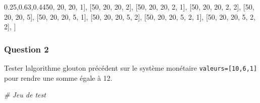 \documentclass[
  paper=a4,
  ,captions=tableheading
]{scrartcl}
\newenvironment{Shaded}{}{}
\newcommand{\CommentTok}[1]{\textcolor[rgb]{0.38,0.63,0.69}{\textit{#1}}}
\newcommand{\DecValTok}[1]{\textcolor[rgb]{0.25,0.63,0.44}{#1}}
\newcommand{\NormalTok}[1]{#1}
\begin{document}
\begin{Shaded}
\begin{Highlighting}[]
\NormalTok{    [}\DecValTok{50}\NormalTok{, }\DecValTok{20}\NormalTok{, }\DecValTok{20}\NormalTok{, }\DecValTok{1}\NormalTok{],}
\NormalTok{    [}\DecValTok{50}\NormalTok{, }\DecValTok{20}\NormalTok{, }\DecValTok{20}\NormalTok{, }\DecValTok{2}\NormalTok{],}
\NormalTok{    [}\DecValTok{50}\NormalTok{, }\DecValTok{20}\NormalTok{, }\DecValTok{20}\NormalTok{, }\DecValTok{2}\NormalTok{, }\DecValTok{1}\NormalTok{],}
\NormalTok{    [}\DecValTok{50}\NormalTok{, }\DecValTok{20}\NormalTok{, }\DecValTok{20}\NormalTok{, }\DecValTok{2}\NormalTok{, }\DecValTok{2}\NormalTok{],}
\NormalTok{    [}\DecValTok{50}\NormalTok{, }\DecValTok{20}\NormalTok{, }\DecValTok{20}\NormalTok{, }\DecValTok{5}\NormalTok{],}
\NormalTok{    [}\DecValTok{50}\NormalTok{, }\DecValTok{20}\NormalTok{, }\DecValTok{20}\NormalTok{, }\DecValTok{5}\NormalTok{, }\DecValTok{1}\NormalTok{],}
\NormalTok{    [}\DecValTok{50}\NormalTok{, }\DecValTok{20}\NormalTok{, }\DecValTok{20}\NormalTok{, }\DecValTok{5}\NormalTok{, }\DecValTok{2}\NormalTok{],}
\NormalTok{    [}\DecValTok{50}\NormalTok{, }\DecValTok{20}\NormalTok{, }\DecValTok{20}\NormalTok{, }\DecValTok{5}\NormalTok{, }\DecValTok{2}\NormalTok{, }\DecValTok{1}\NormalTok{],}
\NormalTok{    [}\DecValTok{50}\NormalTok{, }\DecValTok{20}\NormalTok{, }\DecValTok{20}\NormalTok{, }\DecValTok{5}\NormalTok{, }\DecValTok{2}\NormalTok{, }\DecValTok{2}\NormalTok{],}
\NormalTok{]}
\end{Highlighting}
\end{Shaded}

\hypertarget{question-2}{%
\subsubsection{Question 2}\label{question-2}}

Tester l\textquotesingle algorithme glouton précédent sur le système
monétaire \texttt{valeurs={[}10,6,1{]}} pour rendre une somme égale à
12.

\begin{Shaded}
\begin{Highlighting}[]

\end{Highlighting}
\end{Shaded}

\begin{Shaded}
\begin{Highlighting}[]
\CommentTok{\# Jeu de test}
\end{Highlighting}
\end{Shaded}
\end{document}
